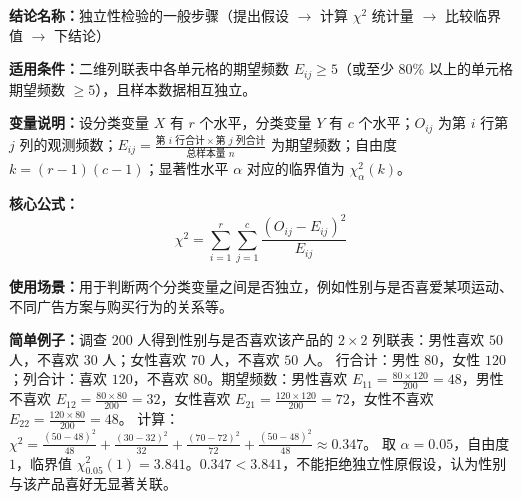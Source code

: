 \textbf{结论名称：}独立性检验的一般步骤（提出假设 $\rightarrow$ 计算 $\chi^{2}$ 统计量 $\rightarrow$ 比较临界值 $\rightarrow$ 下结论）

\textbf{适用条件：}二维列联表中各单元格的期望频数 $E_{ij}\geq 5$（或至少 $80\%$ 以上的单元格期望频数 $\geq 5$），且样本数据相互独立。

\textbf{变量说明：}设分类变量 $X$ 有 $r$ 个水平，分类变量 $Y$ 有 $c$ 个水平；$O_{ij}$ 为第 $i$ 行第 $j$ 列的观测频数；$E_{ij}=\frac{\text{第 }i\text{ 行合计}\times\text{第 }j\text{ 列合计}}{\text{总样本量 }n}$ 为期望频数；自由度 $k=(r-1)(c-1)$；显著性水平 $\alpha$ 对应的临界值为 $\chi^{2}_{\alpha}(k)$。

\textbf{核心公式：}
\[
\boxed{\chi^{2} = \sum_{i=1}^{r}\sum_{j=1}^{c} \frac{(O_{ij} - E_{ij})^{2}}{E_{ij}}}
\]

\textbf{使用场景：}用于判断两个分类变量之间是否独立，例如性别与是否喜爱某项运动、不同广告方案与购买行为的关系等。

\textbf{简单例子：}调查 $200$ 人得到性别与是否喜欢该产品的 $2\times2$ 列联表：男性喜欢 $50$ 人，不喜欢 $30$ 人；女性喜欢 $70$ 人，不喜欢 $50$ 人。  
行合计：男性 $80$，女性 $120$；列合计：喜欢 $120$，不喜欢 $80$。期望频数：男性喜欢 $E_{11}=\frac{80\times120}{200}=48$，男性不喜欢 $E_{12}=\frac{80\times80}{200}=32$，女性喜欢 $E_{21}=\frac{120\times120}{200}=72$，女性不喜欢 $E_{22}=\frac{120\times80}{200}=48$。  
计算：$\chi^{2}=\frac{(50-48)^{2}}{48}+\frac{(30-32)^{2}}{32}+\frac{(70-72)^{2}}{72}+\frac{(50-48)^{2}}{48}\approx 0.347$。  
取 $\alpha=0.05$，自由度 $1$，临界值 $\chi^{2}_{0.05}(1)=3.841$。$0.347<3.841$，不能拒绝独立性原假设，认为性别与该产品喜好无显著关联。